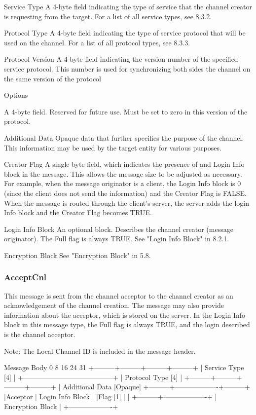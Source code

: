 \documentclass[titlepage,oneside]{book}
\begin{document}
Service Type
  A 4-byte field indicating the type of service that the channel
  creator is requesting from the target. For a list of all service
  types, see 8.3.2.

Protocol Type
  A 4-byte field indicating the type of service protocol that will be 
  used on the channel. For a list of all protocol types, see 
  8.3.3.

Protocol Version
  A 4-byte field indicating the version number of the specified service
  protocol. This number is used for synchronizing both sides the
  channel on the same version of the protocol

Options

  A 4-byte field. Reserved for future use. Must be set to zero in this
  version of the protocol.

Additional Data
  Opaque data that further specifies the purpose of the channel. This
  information may be used by the target entity for various purposes.

Creator Flag
  A single byte field, which indicates the presence of and Login Info
  block in the message. This allows the message size to be adjusted as
  necessary. For example, when the message originator is a client, the
  Login Info block is 0 (since the client does not send the
  information) and the Creator Flag is FALSE. When the message is
  routed through the client's server, the server adds the login Info
  block and the Creator Flag becomes TRUE.

Login Info Block
  An optional block. Describes the channel creator (message
  originator). The Full flag is always TRUE. See "Login Info Block" in
  8.2.1.

Encryption Block
  See "Encryption Block" in 5.8.

\subsubsection{AcceptCnl}

This message is sent from the channel acceptor to the channel creator
as an acknowledgement of the channel creation. The message may also
provide information about the acceptor, which is stored on the server.
In the Login Info block in this message type, the Full flag is always
TRUE, and the login described is the channel acceptor.

Note: The Local Channel ID is included in the message header.

Message Body
0         8         16        24      31
+---------+---------+---------+---------+
|           Service Type [4]            |
+---------------------------------------+
|           Protocol Type [4]           |
+---------+---------+---------+---------+
| Additional Data [Opaque]
+---------+-------------------+---------+
|Acceptor | Login Info Block  |
|Flag [1] |                   |
+---------+-------------------+
          |  Encryption Block |
          +-------------------+
\end{document}
